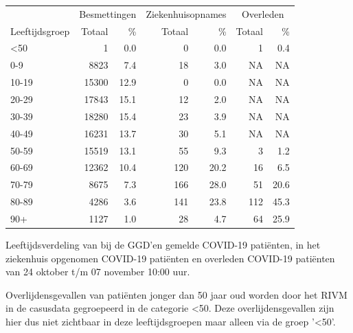 \documentclass[
  english,
  man,floatsintext]{apa6}
\begin{document}
\begin{table}
\centering\begingroup\fontsize{11}{13}\selectfont

\begin{threeparttable}
\begin{tabular}{lrrrrrr}
\toprule
\multicolumn{1}{c}{ } & \multicolumn{2}{c}{Besmettingen} & \multicolumn{2}{c}{Ziekenhuisopnames} & \multicolumn{2}{c}{Overleden} \\
\cmidrule(l{3pt}r{3pt}){2-3} \cmidrule(l{3pt}r{3pt}){4-5} \cmidrule(l{3pt}r{3pt}){6-7}
Leeftijdsgroep & Totaal & \% & Totaal & \% & Totaal & \%\\
\midrule
<50 & 1 & 0.0 & 0 & 0.0 & 1 & 0.4\\
0-9 & 8823 & 7.4 & 18 & 3.0 & NA & NA\\
10-19 & 15300 & 12.9 & 0 & 0.0 & NA & NA\\
20-29 & 17843 & 15.1 & 12 & 2.0 & NA & NA\\
30-39 & 18280 & 15.4 & 23 & 3.9 & NA & NA\\
40-49 & 16231 & 13.7 & 30 & 5.1 & NA & NA\\
50-59 & 15519 & 13.1 & 55 & 9.3 & 3 & 1.2\\
60-69 & 12362 & 10.4 & 120 & 20.2 & 16 & 6.5\\
70-79 & 8675 & 7.3 & 166 & 28.0 & 51 & 20.6\\
80-89 & 4286 & 3.6 & 141 & 23.8 & 112 & 45.3\\
90+ & 1127 & 1.0 & 28 & 4.7 & 64 & 25.9\\
\bottomrule
\end{tabular}
\begin{tablenotes}
\item[1] Leeftijdsverdeling van bij de GGD’en gemelde COVID-19 patiënten, in het ziekenhuis opgenomen COVID-19 patiënten en overleden COVID-19 patiënten van 24 oktober t/m 07 november 10:00 uur.
\item[2] Overlijdensgevallen van patiënten jonger dan 50 jaar oud worden door het RIVM in de casusdata gegroepeerd in de categorie <50. Deze overlijdensgevallen zijn hier dus niet zichtbaar in deze leeftijdsgroepen maar alleen via de groep '<50'.
\end{tablenotes}
\end{threeparttable}
\endgroup{}
\end{table}

\newpage
\end{document}
